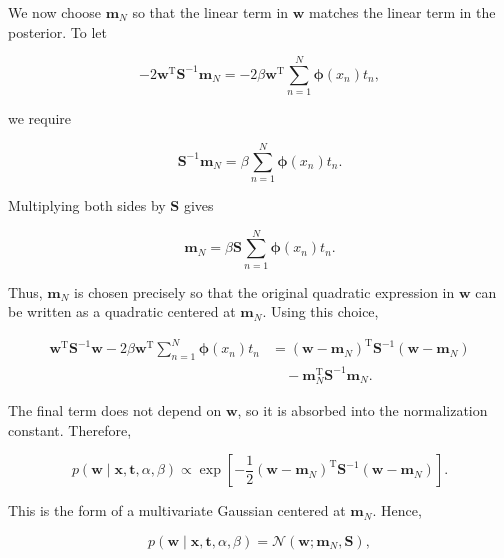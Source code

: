 \documentclass[10pt,twocolumn]{memoir}
\begin{document}
We now choose $\mathbf{m}_N$ so that the linear term in $\mathbf{w}$ matches the linear term in the posterior. To let

\begin{equation}
    -2\mathbf{w}^{\mathrm{T}}\mathbf{S}^{-1}\mathbf{m}_N = -2\beta\mathbf{w}^{\mathrm{T}}\sum_{n=1}^{N}\boldsymbol{\phi}(x_n)t_n,
\end{equation}

we require

\begin{equation}
    \mathbf{S}^{-1}\mathbf{m}_N = \beta\sum_{n=1}^{N}\boldsymbol{\phi}(x_n)t_n.
\end{equation}

Multiplying both sides by $\mathbf{S}$ gives

\begin{equation}
    \mathbf{m}_N = \beta\mathbf{S}\sum_{n=1}^{N}\boldsymbol{\phi}(x_n)t_n.
\end{equation}

Thus, $\mathbf{m}_N$ is chosen precisely so that the original quadratic expression in $\mathbf{w}$ can be written as a quadratic centered at $\mathbf{m}_N$. Using this choice,

\begin{equation}
\begin{aligned}
    \mathbf{w}^{\mathrm{T}}\mathbf{S}^{-1}\mathbf{w} - 2\beta\mathbf{w}^{\mathrm{T}}\sum_{n=1}^{N}\boldsymbol{\phi}(x_n)t_n
    &=
    (\mathbf{w}-\mathbf{m}_N)^{\mathrm{T}}\mathbf{S}^{-1}(\mathbf{w}-\mathbf{m}_N) \\
    &\quad
    -\mathbf{m}_N^{\mathrm{T}}\mathbf{S}^{-1}\mathbf{m}_N.
\end{aligned}
\end{equation}

The final term does not depend on $\mathbf{w}$, so it is absorbed into the normalization constant. Therefore,

\begin{equation}
    p(\mathbf{w}\mid\mathbf{x},\mathbf{t},\alpha,\beta)\propto\exp\left[-\frac{1}{2}(\mathbf{w}-\mathbf{m}_N)^{\mathrm{T}}\mathbf{S}^{-1}(\mathbf{w}-\mathbf{m}_N)\right].
\end{equation}

This is the form of a multivariate Gaussian centered at $\mathbf{m}_N$. Hence,

\begin{equation}
    p(\mathbf{w}\mid\mathbf{x},\mathbf{t},\alpha,\beta) = \mathcal{N}\left(\mathbf{w};\mathbf{m}_N,\mathbf{S}\right),
\label{eq:c1_parameter_bayesian_posterior}
\end{equation}
\end{document}
